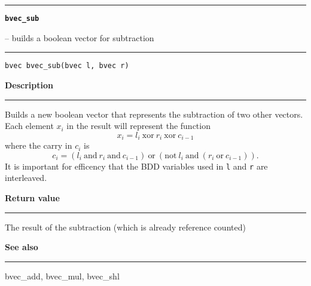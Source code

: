 \begin{minipage}{\textwidth}

\noindent\begin{minipage}{\textwidth}
\rule{\textwidth}{0.5mm}
{\tt\bf bvec\_sub }
\--- builds a boolean vector for subtraction  \hspace{\fill}
\\\rule[1.5ex]{\textwidth}{0.5mm}
\end{minipage}

\noindent\begin{verbatim}
bvec bvec_sub(bvec l, bvec r) 
\end{verbatim}

\vspace{\parsep}\noindent
{\bf Description}\\\rule[1.5ex]{\textwidth}{0.2mm}\vspace{-1.5ex}\setlength{\parindent}{1em}
Builds a new boolean vector that represents the subtraction of two
           other vectors. Each element $x_i$ in the result will represent
	   the function
	   \[ x_i = l_i\ \mbox{xor}\ r_i\ \mbox{xor}\ c_{i-1} \]
	   where the carry in $c_i$ is
	   \[ c_i = (l_i\ \mbox{and}\ r_i\ \mbox{and}\ c_{i-1})\
	            \mbox{or}\ (\mbox{not}\ l_i\ \mbox{and}
	            \ (r_i\ \mbox{or}\ c_{i-1})). \]
	   It is important for efficency that the BDD
	   variables used in {\tt l} and {\tt r} are interleaved. 

\setlength{\parindent}{0em}\vspace{\parsep}\vspace{\baselineskip}\noindent
{\bf Return value}\\\rule[1.5ex]{\textwidth}{0.2mm}\vspace{-1.5ex}
The result of the subtraction (which is already reference counted) 

\vspace{\parsep}\vspace{\baselineskip}\noindent
{\bf See also}\\\rule[1.5ex]{\textwidth}{0.2mm}\vspace{-1.5ex}
bvec\_add, bvec\_mul, bvec\_shl 
\end{minipage}
\vspace{8ex}
